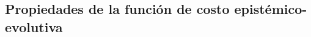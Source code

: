 \documentclass[a4paper,11pt]{book}
\theoremstyle{definition}
\begin{document}
%


\subsection{Propiedades de la funci\'on de costo epist\'emico-evolutiva} \label{sec:propiedades_funcion_costo}
\end{document}
